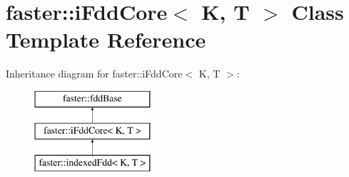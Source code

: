 \hypertarget{classfaster_1_1iFddCore}{}\section{faster\+:\+:i\+Fdd\+Core$<$ K, T $>$ Class Template Reference}
\label{classfaster_1_1iFddCore}
Inheritance diagram for faster\+:\+:i\+Fdd\+Core$<$ K, T $>$\+:\begin{figure}[H]
\begin{center}
\leavevmode
\includegraphics[height=3.000000cm]{classfaster_1_1iFddCore}
\end{center}
\end{figure}
